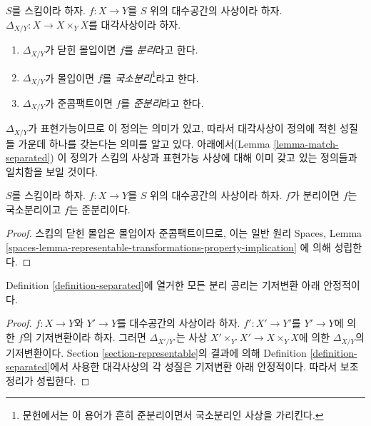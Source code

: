 \begin{definition}
\label{definition-separated}
$S$를 스킴이라 하자.
$f : X \to Y$를 $S$ 위의 대수공간의 사상이라 하자.
$\Delta_{X/Y} : X \to X \times_Y X$를 대각사상이라 하자.
\begin{enumerate}
\item $\Delta_{X/Y}$가 닫힌 몰입이면 $f$를 {\it 분리}라고 한다.
\item $\Delta_{X/Y}$가 몰입이면 $f$를
{\it 국소분리}\footnote{문헌에서는 이 용어가 흔히 준분리이면서
국소분리인 사상을 가리킨다.}라고 한다.
\item $\Delta_{X/Y}$가 준콤팩트이면 $f$를 {\it 준분리}라고 한다.
\end{enumerate}
\end{definition}

\noindent
$\Delta_{X/Y}$가 표현가능이므로 이 정의는 의미가 있고, 따라서
대각사상이 정의에 적힌 성질들 가운데 하나를 갖는다는 의미를 알고 있다.
아래에서(Lemma \ref{lemma-match-separated}) 이 정의가 스킴의 사상과
표현가능 사상에 대해 이미 갖고 있는 정의들과 일치함을 보일 것이다.

\begin{lemma}
\label{lemma-trivial-implications}
$S$를 스킴이라 하자. $f : X \to Y$를 $S$ 위의 대수공간의 사상이라 하자.
$f$가 분리이면 $f$는 국소분리이고 $f$는 준분리이다.
\end{lemma}

\begin{proof}
스킴의 닫힌 몰입은 몰입이자 준콤팩트이므로, 이는 일반 원리
Spaces, Lemma
\ref{spaces-lemma-representable-transformations-property-implication}
에 의해 성립한다.
\end{proof}

\begin{lemma}
\label{lemma-base-change-separated}
Definition \ref{definition-separated}에 열거한 모든 분리 공리는
기저변환 아래 안정적이다.
\end{lemma}

\begin{proof}
$f : X \to Y$와 $Y' \to Y$를 대수공간의 사상이라 하자.
$f' : X' \to Y'$를 $Y' \to Y$에 의한 $f$의 기저변환이라 하자.
그러면 $\Delta_{X'/Y'}$는 사상
$X' \times_{Y'} X' \to X \times_Y X$에 의한
$\Delta_{X/Y}$의 기저변환이다.
Section \ref{section-representable}의 결과에 의해
Definition \ref{definition-separated}에서 사용한 대각사상의 각 성질은
기저변환 아래 안정적이다. 따라서 보조정리가 성립한다.
\end{proof}

